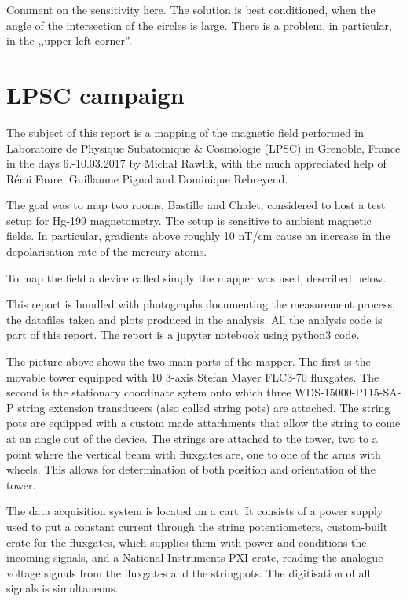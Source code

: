 Comment on the sensitivity here. The solution is best conditioned, when the angle of the intersection of the circles is large. There is a problem, in particular, in the ,,upper-left corner''.



\section{LPSC campaign}
The subject of this report is a mapping of the magnetic field performed in Laboratoire de Physique Subatomique \& Cosmologie (LPSC) in Grenoble, France in the days 6.-10.03.2017 by Michał Rawlik, with the much appreciated help of Rémi Faure, Guillaume Pignol and Dominique Rebreyend.

The goal was to map two rooms, Bastille and Chalet, considered to host a test setup for Hg-199 magnetometry. The setup is sensitive to ambient magnetic fields. In particular, gradients above roughly 10 nT/cm cause an increase in the depolarisation rate of the mercury atoms.

To map the field a device called simply the mapper was used, described below.

This report is bundled with photographs documenting the measurement process, the datafiles taken and plots produced in the analysis. All the analysis code is part of this report. The report is a jupyter notebook using python3 code.

The picture above shows the two main parts of the mapper. The first is the movable tower equipped with 10 3-axis Stefan Mayer FLC3-70 fluxgates. The second is the stationary coordinate sytem onto which three WDS-15000-P115-SA-P string extension transducers (also called string pots) are attached. The string pots are equipped with a custom made attachments that allow the string to come at an angle out of the device. The strings are attached to the tower, two to a point where the vertical beam with fluxgates are, one to one of the arms with wheels. This allows for determination of both position and orientation of the tower.

The data acquisition system is located on a cart. It consists of a power supply used to put a constant current through the string potentiometers, custom-built crate for the fluxgates, which supplies them with power and conditions the incoming signals, and a National Instruments PXI crate, reading the analogue voltage signals from the fluxgates and the stringpots. The digitisation of all signals is simultaneous.

